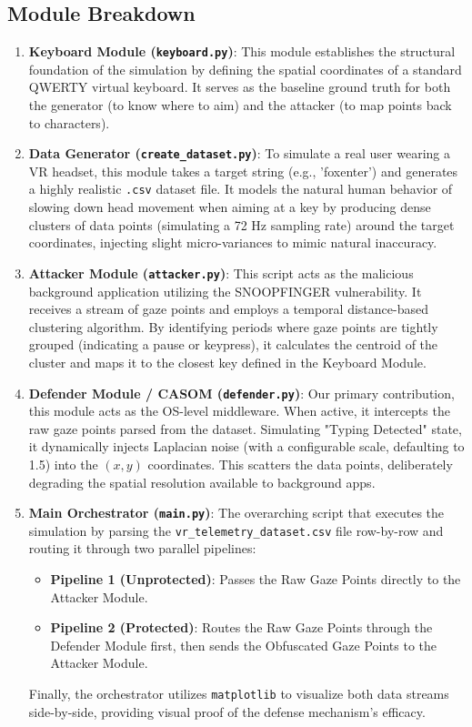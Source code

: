 \documentclass[12pt,a4paper]{article}
\begin{document}
\subsection{Module Breakdown}
\begin{enumerate}
    \item \textbf{Keyboard Module (\texttt{keyboard.py})}: This module establishes the structural foundation of the simulation by defining the spatial coordinates of a standard QWERTY virtual keyboard. It serves as the baseline ground truth for both the generator (to know where to aim) and the attacker (to map points back to characters).
    
    \item \textbf{Data Generator (\texttt{create\_dataset.py})}: To simulate a real user wearing a VR headset, this module takes a target string (e.g., 'foxenter') and generates a highly realistic \texttt{.csv} dataset file. It models the natural human behavior of slowing down head movement when aiming at a key by producing dense clusters of data points (simulating a 72 Hz sampling rate) around the target coordinates, injecting slight micro-variances to mimic natural inaccuracy.
    
    \item \textbf{Attacker Module (\texttt{attacker.py})}: This script acts as the malicious background application utilizing the SNOOPFINGER vulnerability. It receives a stream of gaze points and employs a temporal distance-based clustering algorithm. By identifying periods where gaze points are tightly grouped (indicating a pause or keypress), it calculates the centroid of the cluster and maps it to the closest key defined in the Keyboard Module.
    
    \item \textbf{Defender Module / CASOM (\texttt{defender.py})}: Our primary contribution, this module acts as the OS-level middleware. When active, it intercepts the raw gaze points parsed from the dataset. Simulating "Typing Detected" state, it dynamically injects Laplacian noise (with a configurable scale, defaulting to 1.5) into the $(x, y)$ coordinates. This scatters the data points, deliberately degrading the spatial resolution available to background apps.
    
    \item \textbf{Main Orchestrator (\texttt{main.py})}: The overarching script that executes the simulation by parsing the \texttt{vr\_telemetry\_dataset.csv} file row-by-row and routing it through two parallel pipelines:
    \begin{itemize}
        \item \textbf{Pipeline 1 (Unprotected)}: Passes the Raw Gaze Points directly to the Attacker Module.
        \item \textbf{Pipeline 2 (Protected)}: Routes the Raw Gaze Points through the Defender Module first, then sends the Obfuscated Gaze Points to the Attacker Module.
    \end{itemize}
    Finally, the orchestrator utilizes \texttt{matplotlib} to visualize both data streams side-by-side, providing visual proof of the defense mechanism's efficacy.
\end{enumerate}
\end{document}
